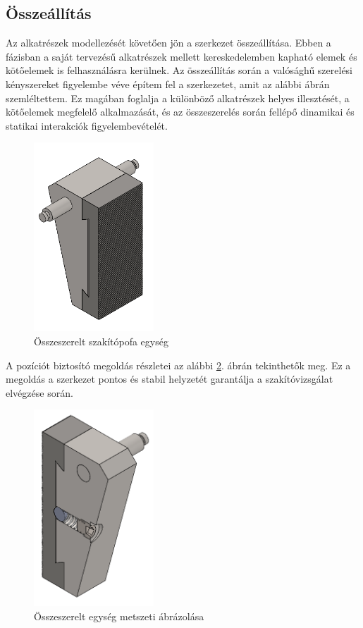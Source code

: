 \documentclass[12pt,a4paper,oneside]{report}
\begin{document}
\subsection{Összeállítás}
Az alkatrészek modellezését követően jön a szerkezet összeállítása. Ebben a fázisban a saját tervezésű alkatrészek mellett kereskedelemben kapható elemek és kötőelemek is felhasználásra kerülnek. Az összeállítás során a valósághű szerelési kényszereket figyelembe véve építem fel a szerkezetet, amit az alábbi ábrán szemléltettem. Ez magában foglalja a különböző alkatrészek helyes illesztését, a kötőelemek megfelelő alkalmazását, és az összeszerelés során fellépő dinamikai és statikai interakciók figyelembevételét.
\begin{figure}[H]
    \centering
    \includegraphics[width=4.5cm]{figures/Assembly_1.png}
    \caption{Összeszerelt szakítópofa egység}
    \label{Fig:Assembly_1}
\end{figure}

A pozíciót biztosító megoldás részletei az alábbi \ref{Fig:Assembly_2}. ábrán tekinthetők meg. Ez a megoldás a szerkezet pontos és stabil helyzetét garantálja a szakítóvizsgálat elvégzése során.
\begin{figure}[H]
    \centering
    \includegraphics[width=4.5cm]{figures/Assembly_2.png}
    \caption{Összeszerelt egység metszeti ábrázolása}
    \label{Fig:Assembly_2}
\end{figure}
\end{document}
